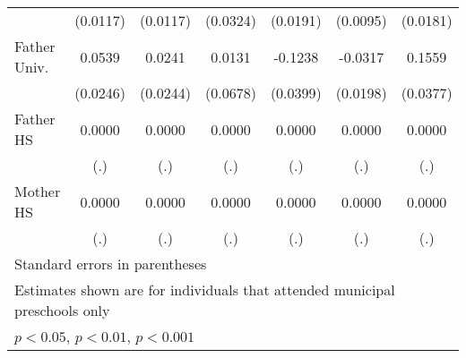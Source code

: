 \begin{table}[htbp]
\begin{tabular}{l*{6}{c}}
            &    (0.0117)         &    (0.0117)         &    (0.0324)         &    (0.0191)         &    (0.0095)         &    (0.0181)         \\
\addlinespace
Father Univ.&      0.0539\sym{*}  &      0.0241         &      0.0131         &     -0.1238\sym{**} &     -0.0317         &      0.1559\sym{***}\\
            &    (0.0246)         &    (0.0244)         &    (0.0678)         &    (0.0399)         &    (0.0198)         &    (0.0377)         \\
\addlinespace
Father HS   &      0.0000         &      0.0000         &      0.0000         &      0.0000         &      0.0000         &      0.0000         \\
            &         (.)         &         (.)         &         (.)         &         (.)         &         (.)         &         (.)         \\
\addlinespace
Mother HS   &      0.0000         &      0.0000         &      0.0000         &      0.0000         &      0.0000         &      0.0000         \\
            &         (.)         &         (.)         &         (.)         &         (.)         &         (.)         &         (.)         \\
\bottomrule
\multicolumn{7}{l}{\footnotesize Standard errors in parentheses}\\
\multicolumn{7}{l}{\footnotesize Estimates shown are for individuals that attended municipal preschools only}\\
\multicolumn{7}{l}{\footnotesize \sym{*} \(p<0.05\), \sym{**} \(p<0.01\), \sym{***} \(p<0.001\)}\\
\end{tabular}
\end{table}
